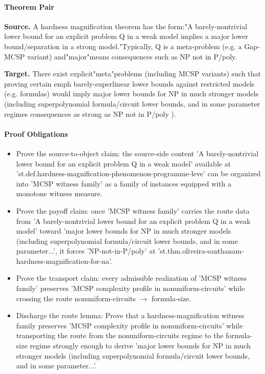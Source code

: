 \documentclass[11pt]{article}
\begin{document}
\paragraph{Theorem Pair}
\textbf{Source.} A hardness magnification theorem has the form:"A barely-nontrivial lower bound for an explicit problem Q in a weak model implies a major lower bound/separation in a strong model."Typically, Q is a meta-problem (e.g. a Gap-MCSP variant) and"major"means consequences such as NP not in P/poly.

\textbf{Target.} There exist explicit"meta"problems (including MCSP variants) such that proving certain emph barely-superlinear lower bounds against restricted models (e.g. formulas) would imply major lower bounds for NP in much stronger models (including superpolynomial formula/circuit lower bounds, and in some parameter regimes consequences as strong as NP not in P/poly ).

\paragraph{Proof Obligations}
\begin{itemize}[leftmargin=*,itemsep=0.2em]
\item Prove the source-to-object claim: the source-side content 'A barely-nontrivial lower bound for an explicit problem Q in a weak model' available at 'st.def.hardness-magnification-phenomenon-programme-leve' can be organized into 'MCSP witness family' as a family of instances equipped with a monotone witness measure.
\item Prove the payoff claim: once 'MCSP witness family' carries the route data from 'A barely-nontrivial lower bound for an explicit problem Q in a weak model' toward 'major lower bounds for NP in much stronger models (including superpolynomial formula/circuit lower bounds, and in some parameter...', it forces 'NP-not-in-P/poly' at 'st.thm.oliveira-santhanam-hardness-magnification-for-na'.
\item Prove the transport claim: every admissible realization of 'MCSP witness family' preserves 'MCSP complexity profile in nonuniform-circuits' while crossing the route nonuniform-circuits $\rightarrow$  formula-size.
\item Discharge the route lemma: Prove that a hardness-magnification witness family preserves 'MCSP complexity profile in nonuniform-circuits' while transporting the route from the nonuniform-circuits regime to the formula-size regime strongly enough to derive 'major lower bounds for NP in much stronger models (including superpolynomial formula/circuit lower bounds, and in some parameter...'.
\end{itemize}
\end{document}
